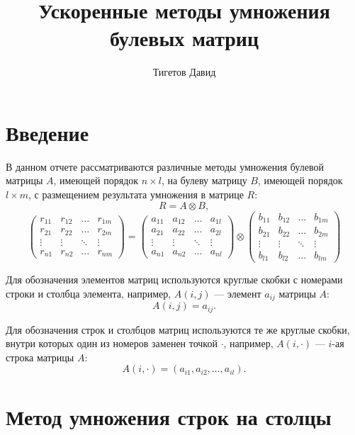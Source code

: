 \documentclass[a4paper,12pt]{report}
\begin{document}
\title { Ускоренные методы умножения\\булевых матриц }
\author { Тигетов Давид }
\maketitle

\tableofcontents

\chapter { Введение }

В данном отчете рассматриваются различные методы умножения булевой матрицы $A$, имеющей порядок $n \times l$,
на булеву матрицу $B$, имеющей порядок $l \times m$, с размещением результата умножения в матрице $R$:
$$
	R = A \otimes B,
$$
$$
	\begin{pmatrix}
		r_{11} & r_{12} & \ldots & r_{1m} \\
		r_{21} & r_{22} & \ldots & r_{2m} \\
		\vdots & \vdots & \ddots & \vdots \\
		r_{n1} & r_{n2} & \ldots & r_{nm}
	\end{pmatrix}
 	=
	\begin{pmatrix}
		a_{11} & a_{12} & \ldots & a_{1l} \\
		a_{21} & a_{22} & \ldots & a_{2l} \\
		\vdots & \vdots & \ddots & \vdots \\
		a_{n1} & a_{n2} & \ldots & a_{nl}
	\end{pmatrix}
	\otimes
	\begin{pmatrix}
		b_{11} & b_{12} & \ldots & b_{1m} \\
		b_{21} & b_{22} & \ldots & b_{2m} \\
		\vdots & \vdots & \ddots & \vdots \\
		b_{l1} & b_{l2} & \ldots & b_{lm}
	\end{pmatrix}
$$

Для обозначения элементов матриц используются круглые скобки с номерами строки и столбца элемента, например,
$A(i,j)$ --- элемент $a_{ij}$ матрицы $A$:
$$
	A(i,j) = a_{ij}.
$$

Для обозначения строк и столбцов матриц используются те же круглые скобки, внутри которых один из номеров заменен
точкой $\cdot$, например, $A(i,\cdot)$ --- $i$-ая строка матрицы $A$:
$$
	A(i,\cdot) = ( a_{i1}, a_{i2}, \dots, a_{il} ).
$$

\chapter { Метод умножения строк на столцы }
\end{document}
